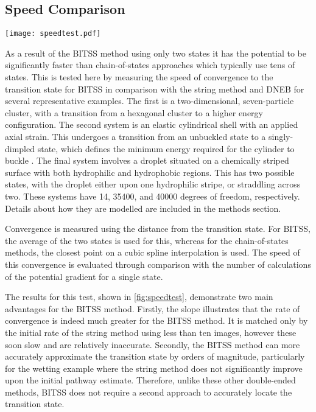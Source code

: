 \documentclass[twocolumn,10pt]{revtex4-2}
\begin{document}
\subsection{Speed Comparison}
\begin{figure*}[tb]
  \texttt{[image: speedtest.pdf]}
  \caption{\label{fig:speedtest}
    Comparisons between BITSS, DNEB, and the string method in the convergence to the transition state as a function of the number of calculations of the energy gradient.
    Three test systems are used: (a) a Lennard-Jones seven-particle cluster, (b) cylindrical shell buckling, and (c) wetting of a chemically-striped surface.
    The configurations shown correspond to the two minimum energy states and the transition state, marked by an asterisk.
    The string method and DNEB are repeated with a differing number of images, as listed in the legend in (c).
  }
\end{figure*}
As a result of the BITSS method using only two states it has the potential to be significantly faster than chain-of-states approaches which typically use tens of states.
This is tested here by measuring the speed of convergence to the transition state for BITSS in comparison with the string method and DNEB for several representative examples.
The first is a two-dimensional, seven-particle cluster, with a transition from a hexagonal cluster to a higher energy configuration.
The second system is an elastic cylindrical shell with an applied axial strain.
This undergoes a transition from an unbuckled state to a singly-dimpled state, which defines the minimum energy required for the cylinder to buckle \cite{Panter2019}.
The final system involves a droplet situated on a chemically striped surface with both hydrophilic and hydrophobic regions.
This has two possible states, with the droplet either upon one hydrophilic stripe, or straddling across two.
These systems have 14, 35400, and 40000 degrees of freedom, respectively.
Details about how they are modelled are included in the methods section.

Convergence is measured using the distance from the transition state.
For BITSS, the average of the two states is used for this, whereas for the chain-of-states methods, the closest point on a cubic spline interpolation is used.
The speed of this convergence is evaluated through comparison with the number of calculations of the potential gradient for a single state.

The results for this test, shown in \cref{fig:speedtest}, demonstrate two main advantages for the BITSS method.
Firstly, the slope illustrates that the rate of convergence is indeed much greater for the BITSS method.
It is matched only by the initial rate of the string method using less than ten images, however these soon slow and are relatively inaccurate.
Secondly, the BITSS method can more accurately approximate the transition state by orders of magnitude, particularly for the wetting example where the string method does not significantly improve upon the initial pathway estimate.
Therefore, unlike these other double-ended methods, BITSS does not require a second approach to accurately locate the transition state.
\end{document}
